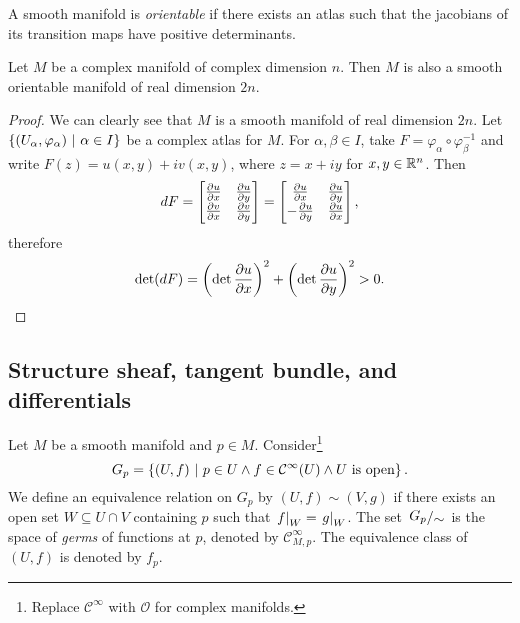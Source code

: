 \begin{definicija}
A smooth manifold is \emph{orientable} if there
exists an atlas such that the jacobians of its transition maps have
positive determinants.
\end{definicija}


\begin{trditev}
Let $M$ be a complex manifold of complex dimension $n$. Then $M$ is
also a smooth orientable manifold of real dimension $2n$.
\end{trditev}

\begin{proof}
We can clearly see that $M$ is a smooth manifold of real dimension
$2n$. Let $\left\{(U_\alpha, \varphi_\alpha)~\middle\vert~\alpha \in I\right\}$ be a
complex atlas for $M$. For $\alpha, \beta \in I$, take
$F = \varphi_\alpha \circ \varphi_\beta^{-1}$ and write
$F(z) = u(x,y) + i v(x,y)$, where $z = x + iy$ for $x, y \in \mathbb{R}^n$.
Then
\[
dF =
\begin{bmatrix}
\frac{\partial u}{\partial x} & \frac{\partial u}{\partial y} \\
\frac{\partial v}{\partial x} & \frac{\partial v}{\partial y}
\end{bmatrix}
=
\begin{bmatrix}
 \frac{\partial u}{\partial x} & \frac{\partial u}{\partial y} \\
-\frac{\partial u}{\partial y} & \frac{\partial u}{\partial x}
\end{bmatrix},
\]
therefore
\[
\det (dF) = \left(\det \frac{\partial u}{\partial x}\right)^2 + \left(\det \frac{\partial u}{\partial y}\right)^2 > 0.
\qedhere
\]
\end{proof}

\newpage

\subsection{Structure sheaf, tangent bundle, and differentials}

\begin{definicija}
Let $M$ be a smooth manifold and $p \in M$.
Consider\footnote{Replace $\mathcal{C}^\infty$ with $\mathcal{O}$
for complex manifolds.}
\[
G_p =
\left\{(U, f)~\middle\vert~p \in U \land f \in \mathcal{C}^\infty(U) \land 
\text{$U$ is open}\right\}.
\]
We define an equivalence relation on $G_p$ by
$(U, f) \sim (V, g)$ if there exists an open set
$W \subseteq U \cap V$ containing $p$ such that
$\left. f\right|_{W}^{} = \left. g\right|_{W}^{}$. The set $\kvoc{G_p}{\sim}$ is the
space of \emph{germs} of functions at $p$, denoted by
$\mathcal{C}_{M,p}^\infty$. The equivalence class of $(U, f)$ is
denoted by $f_p$.
\end{definicija}

